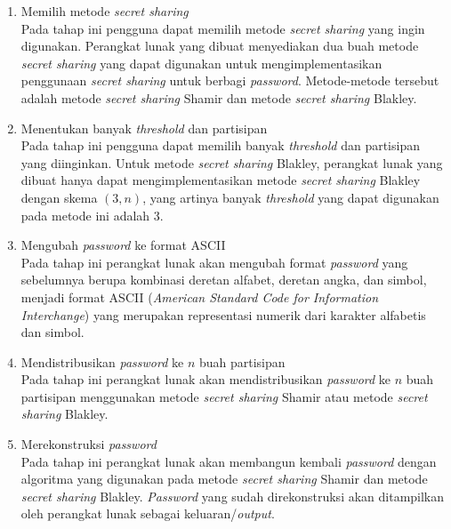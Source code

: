 \documentclass[a4paper,twoside]{article}
\begin{document}
\begin{enumerate}
\begin{itemize}
\begin{enumerate}
		\item Memilih metode \textit{secret sharing} \\
		Pada tahap ini pengguna dapat memilih metode \textit{secret sharing} yang ingin digunakan. Perangkat lunak yang dibuat menyediakan dua buah metode \textit{secret sharing} yang dapat digunakan untuk mengimplementasikan penggunaan \textit{secret sharing} untuk berbagi \textit{password}. Metode-metode tersebut adalah metode \textit{secret sharing} Shamir dan metode \textit{secret sharing} Blakley. \\
		
		\item Menentukan banyak \textit{threshold} dan partisipan \\
		Pada tahap ini pengguna dapat memilih banyak \textit{threshold} dan partisipan yang diinginkan. Untuk metode \textit{secret sharing} Blakley, perangkat lunak yang dibuat hanya dapat mengimplementasikan metode \textit{secret sharing} Blakley dengan skema $(3,n)$, yang artinya banyak \textit{threshold} yang dapat digunakan pada metode ini adalah 3. \\
		
		\item Mengubah \textit{password} ke format ASCII \\	
		Pada tahap ini perangkat lunak akan mengubah format \textit{password} yang sebelumnya berupa kombinasi deretan alfabet, deretan angka, dan simbol, menjadi format ASCII (\textit{American Standard Code for Information Interchange}) yang merupakan representasi numerik dari karakter alfabetis dan simbol. \\
		
		\item Mendistribusikan \textit{password} ke $n$ buah partisipan \\
		Pada tahap ini perangkat lunak akan mendistribusikan \textit{password} ke $n$ buah partisipan menggunakan metode \textit{secret sharing} Shamir atau metode \textit{secret sharing} Blakley. \\
		
		\item Merekonstruksi \textit{password} \\
		Pada tahap ini perangkat lunak akan membangun kembali \textit{password} dengan algoritma yang digunakan pada metode \textit{secret sharing} Shamir dan metode \textit{secret sharing} Blakley. \textit{Password} yang sudah direkonstruksi akan ditampilkan oleh perangkat lunak sebagai keluaran/\textit{output}. \\
		\end{enumerate}
		

\end{itemize}
\end{enumerate}
\end{document}
